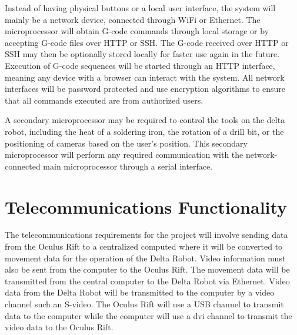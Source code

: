 Instead of having physical buttons or a local user interface, the system will mainly be a network device, connected through WiFi or Ethernet.
The microprocessor will obtain G-code commands through local storage or by accepting G-code files over HTTP or SSH.
The G-code received over HTTP or SSH may then be optionally stored locally for faster use again in the future.
Execution of G-code sequences will be started through an HTTP interface, meaning any device with a browser can interact with the system.
All network interfaces will be password protected and use encryption algorithms to ensure that all commands executed are from authorized users. 

A secondary microprocessor may be required to control the tools on the delta robot, including the heat of a soldering iron, the rotation of a drill bit, or the positioning of cameras based on the user's position.
This secondary microprocessor will perform any required communication with the network-connected main microprocessor through a serial interface. 

\section{Telecommunications Functionality}
The telecommunications requirements for the project will involve sending data from the Oculus Rift to a centralized computed where it will be converted to movement data for the operation of the Delta Robot.
Video information must also be sent from the computer to the Oculus Rift.
The movement data will be transmitted from the central computer to the Delta Robot via Ethernet.
Video data from the Delta Robot will be transmitted to the computer by a video channel such an S-video.
The Oculus Rift will use a USB channel to transmit data to the computer while the computer will use a \gls{dvi} channel to transmit the video data to the Oculus Rift.

